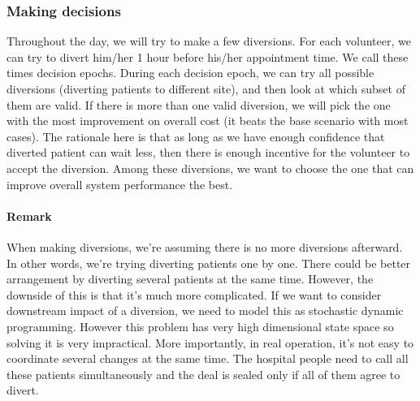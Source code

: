 \subsubsection{Making decisions}

Throughout the day, we will try to make a few diversions. For each volunteer, we can try to divert him/her 1 hour before his/her appointment time. We call these times decision epochs. During each decision epoch, we can try all possible diversions (diverting patients to different site), and then look at which subset of them are valid. If there is more than one valid diversion, we will pick the one with the most improvement on overall cost (it beats the base scenario with most cases). The rationale here is that as long as we have enough confidence that diverted patient can wait less, then there is enough incentive for the volunteer to accept the diversion. Among these diversions, we want to choose the one that can improve overall system performance the best.

\paragraph{Remark} When making diversions, we're assuming there is no more diversions afterward. In other words, we're trying diverting patients one by one. There could be better arrangement by diverting several patients at the same time. However, the downside of this is that it's much more complicated. If we want to consider downstream impact of a diversion, we need to model this as stochastic dynamic programming. However this problem has very high dimensional state space so solving it is very impractical. More importantly, in real operation, it's not easy to coordinate several changes at the same time. The hospital people need to call all these patients simultaneously and the deal is sealed only if all of them agree to divert. 